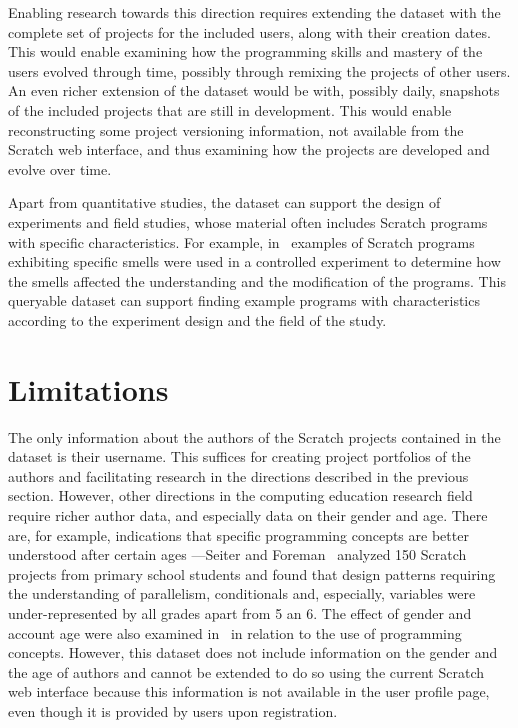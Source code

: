 \documentclass[10pt, conference]{IEEEtran}
\begin{document}
Enabling research towards this direction requires extending the dataset with the complete set of projects for the included users, along with their creation dates.
This would enable examining how the programming skills and mastery of the users evolved through time, possibly through remixing the projects of other users.
An even richer extension of the dataset would be with, possibly daily, snapshots of the included projects that are still in development.
This would enable reconstructing some project versioning information, not available from the Scratch web interface, and thus examining how the projects are developed and evolve over time.

Apart from quantitative studies, the dataset can support the design of experiments and field studies, whose material often includes Scratch programs with specific characteristics.
For example, in~\cite{hermans_2016} examples of Scratch programs exhibiting specific smells were used in a controlled experiment to determine how the smells affected the understanding and the modification of the programs.
This queryable dataset can support finding example programs with characteristics according to the experiment design and the field of the study.

\section{Limitations}
The only information about the authors of the Scratch projects contained in the dataset is their username.
This suffices for creating project portfolios of the authors and facilitating research in the directions described in the previous section.
However, other directions in the computing education research field require richer author data, and especially data on their gender and age.
There are, for example, indications that specific programming concepts are better understood after certain ages ---Seiter and Foreman~\cite{Seiter_2013} analyzed 150 Scratch projects from primary school students and found that design patterns requiring the understanding of parallelism, conditionals and, especially, variables were under-represented by all grades apart from 5 an 6.
The effect of gender and account age were also examined in~\cite{fields_2014} in relation to the use of programming concepts.
However, this dataset does not include information on the gender and the age of authors and cannot be extended to do so using the current Scratch web interface because this information is not available in the user profile page\footnotemark[\ref{fn-authorpage}], even though it is provided by users upon registration.
\end{document}
